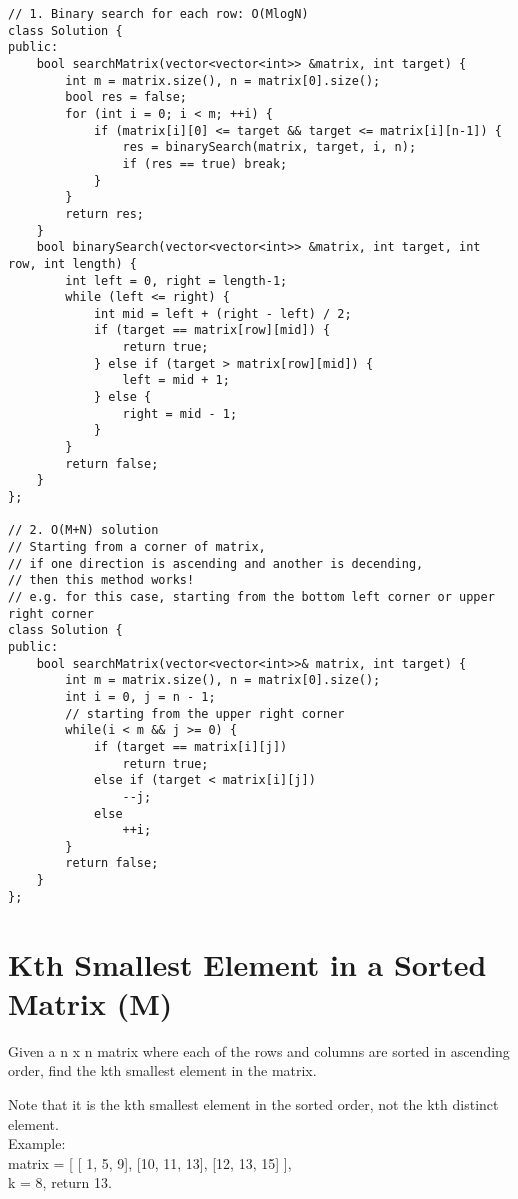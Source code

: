 \begin{lstlisting}
// 1. Binary search for each row: O(MlogN)
class Solution {
public:
    bool searchMatrix(vector<vector<int>> &matrix, int target) {
        int m = matrix.size(), n = matrix[0].size();
        bool res = false;
        for (int i = 0; i < m; ++i) {
            if (matrix[i][0] <= target && target <= matrix[i][n-1]) {
                res = binarySearch(matrix, target, i, n);
                if (res == true) break;
            }
        }
        return res;
    }
    bool binarySearch(vector<vector<int>> &matrix, int target, int row, int length) {
        int left = 0, right = length-1;
        while (left <= right) {
            int mid = left + (right - left) / 2;
            if (target == matrix[row][mid]) {
                return true;
            } else if (target > matrix[row][mid]) {
                left = mid + 1;
            } else {
                right = mid - 1;
            }
        }
        return false;
    }
};

// 2. O(M+N) solution
// Starting from a corner of matrix, 
// if one direction is ascending and another is decending,
// then this method works!
// e.g. for this case, starting from the bottom left corner or upper right corner
class Solution {
public:
    bool searchMatrix(vector<vector<int>>& matrix, int target) {
        int m = matrix.size(), n = matrix[0].size();
        int i = 0, j = n - 1;
        // starting from the upper right corner
        while(i < m && j >= 0) {
            if (target == matrix[i][j])
                return true;
            else if (target < matrix[i][j])
                --j;
            else
                ++i;
        }
        return false;
    }
};
\end{lstlisting}


\section{Kth Smallest Element in a Sorted Matrix (M)}
Given a n x n matrix where each of the rows and columns are sorted in ascending order, find the kth smallest element in the matrix.\

Note that it is the kth smallest element in the sorted order, not the kth distinct element.\\

Example:\\
matrix = [
   [ 1,  5,  9],
   [10, 11, 13],
   [12, 13, 15]
],\\
k = 8, return 13.\\

